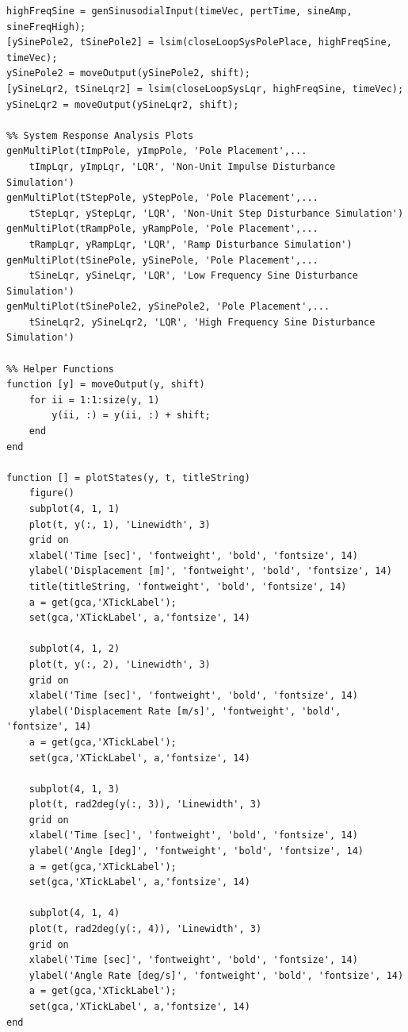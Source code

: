 \documentclass[titlepage]{article}
\begin{document}
\begin{lstlisting}[style=Matlab-editor]
% high freq sine
highFreqSine = genSinusodialInput(timeVec, pertTime, sineAmp, sineFreqHigh);
[ySinePole2, tSinePole2] = lsim(closeLoopSysPolePlace, highFreqSine, timeVec);
ySinePole2 = moveOutput(ySinePole2, shift);
[ySineLqr2, tSineLqr2] = lsim(closeLoopSysLqr, highFreqSine, timeVec);
ySineLqr2 = moveOutput(ySineLqr2, shift);

%% System Response Analysis Plots
genMultiPlot(tImpPole, yImpPole, 'Pole Placement',...
    tImpLqr, yImpLqr, 'LQR', 'Non-Unit Impulse Disturbance Simulation')
genMultiPlot(tStepPole, yStepPole, 'Pole Placement',...
    tStepLqr, yStepLqr, 'LQR', 'Non-Unit Step Disturbance Simulation')
genMultiPlot(tRampPole, yRampPole, 'Pole Placement',...
    tRampLqr, yRampLqr, 'LQR', 'Ramp Disturbance Simulation')
genMultiPlot(tSinePole, ySinePole, 'Pole Placement',...
    tSineLqr, ySineLqr, 'LQR', 'Low Frequency Sine Disturbance Simulation')
genMultiPlot(tSinePole2, ySinePole2, 'Pole Placement',...
    tSineLqr2, ySineLqr2, 'LQR', 'High Frequency Sine Disturbance Simulation')

%% Helper Functions
function [y] = moveOutput(y, shift)
    for ii = 1:1:size(y, 1)
        y(ii, :) = y(ii, :) + shift;
    end
end

function [] = plotStates(y, t, titleString)
    figure()
    subplot(4, 1, 1)
    plot(t, y(:, 1), 'Linewidth', 3)
    grid on
    xlabel('Time [sec]', 'fontweight', 'bold', 'fontsize', 14)
    ylabel('Displacement [m]', 'fontweight', 'bold', 'fontsize', 14)
    title(titleString, 'fontweight', 'bold', 'fontsize', 14)
    a = get(gca,'XTickLabel');
    set(gca,'XTickLabel', a,'fontsize', 14)
    
    subplot(4, 1, 2)
    plot(t, y(:, 2), 'Linewidth', 3)
    grid on
    xlabel('Time [sec]', 'fontweight', 'bold', 'fontsize', 14)
    ylabel('Displacement Rate [m/s]', 'fontweight', 'bold', 'fontsize', 14)
    a = get(gca,'XTickLabel');
    set(gca,'XTickLabel', a,'fontsize', 14)

    subplot(4, 1, 3)
    plot(t, rad2deg(y(:, 3)), 'Linewidth', 3)
    grid on
    xlabel('Time [sec]', 'fontweight', 'bold', 'fontsize', 14)
    ylabel('Angle [deg]', 'fontweight', 'bold', 'fontsize', 14)
    a = get(gca,'XTickLabel');
    set(gca,'XTickLabel', a,'fontsize', 14)
    
    subplot(4, 1, 4)
    plot(t, rad2deg(y(:, 4)), 'Linewidth', 3)
    grid on
    xlabel('Time [sec]', 'fontweight', 'bold', 'fontsize', 14)
    ylabel('Angle Rate [deg/s]', 'fontweight', 'bold', 'fontsize', 14)
    a = get(gca,'XTickLabel');
    set(gca,'XTickLabel', a,'fontsize', 14)
end


\end{lstlisting}
\end{document}
